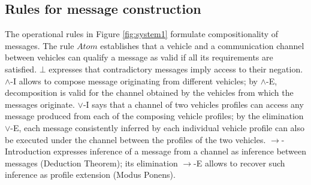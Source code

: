\documentclass[compsoc, conference, letterpaper, 10pt, times]{IEEEtran}
\begin{document}
\subsection{Rules for message construction}

The operational rules in Figure \ref{fig:system1} formulate compositionality of messages. The rule $Atom$ establishes that a vehicle and a communication channel between vehicles can qualify a message as valid if all its requirements are satisfied. $\bot$ expresses that contradictory messages imply access to their negation. $\wedge$-I allows to compose message originating from different vehicles; by $\wedge$-E, decomposition is valid for the channel obtained by the vehicles from which the messages originate. $\vee$-I says that a channel of two vehicles profiles can access any message produced from each of the composing vehicle profiles; by the elimination $\vee$-E, each message consistently inferred by each individual vehicle profile can also be executed under the channel between the profiles of the two vehicles. $\rightarrow$-Introduction expresses inference of a message from a channel as inference between messages (Deduction Theorem); its elimination $\rightarrow$-E allows to recover such inference as profile extension (Modus Ponens).
\end{document}
